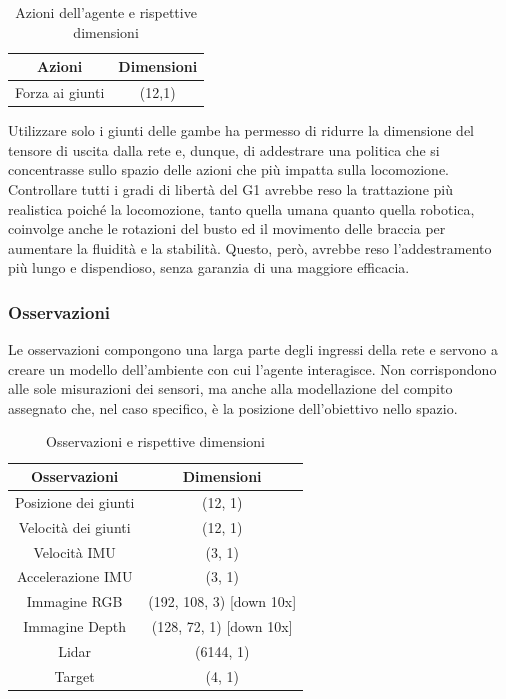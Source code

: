 \begin{table}[h]
    \centering
    \begin{tabular}{|c|c|}\hline
         \textbf{Azioni} & \textbf{Dimensioni}\\ \hline
         Forza ai giunti & (12,1)\\ \hline
    \end{tabular}
    \caption{Azioni dell'agente e rispettive dimensioni}
    \label{tab:act}
\end{table}

Utilizzare solo i giunti delle gambe ha permesso di ridurre la dimensione del tensore di uscita dalla rete e, dunque, di addestrare una politica che si concentrasse sullo spazio delle azioni che più impatta sulla locomozione. Controllare tutti i gradi di libertà del G1 avrebbe reso la trattazione più realistica poiché la locomozione, tanto quella umana quanto quella robotica, coinvolge anche le rotazioni del busto ed il movimento delle braccia per aumentare la fluidità e la stabilità. Questo, però, avrebbe reso l'addestramento più lungo e dispendioso, senza garanzia di una maggiore efficacia.





\subsubsection{Osservazioni}
Le osservazioni compongono una larga parte degli ingressi della rete e servono a creare un modello dell'ambiente con cui l'agente interagisce. Non corrispondono alle sole misurazioni dei sensori, ma anche alla modellazione del compito assegnato che, nel caso specifico, è la posizione dell'obiettivo nello spazio.


\begin{table}[h]
    \centering
    \begin{tabular}{|c|c|}
    \hline
    \textbf{Osservazioni} & \textbf{Dimensioni} \\ \hline
    Posizione dei giunti & (12, 1) \\ \hline
    Velocità dei giunti & (12, 1) \\ \hline
    Velocità IMU & (3, 1) \\ \hline
    Accelerazione IMU & (3, 1) \\ \hline
    Immagine RGB & (192, 108, 3) [down 10x] \\ \hline
    Immagine Depth & (128, 72, 1) [down 10x]\\ \hline
    Lidar & (6144, 1) \\ \hline
    Target & (4, 1) \\ \hline
    \end{tabular}
    \caption{Osservazioni e rispettive dimensioni}
    \label{tab:obs}
\end{table}

